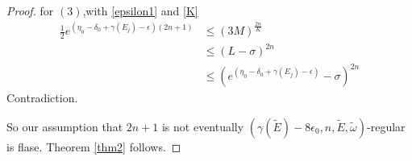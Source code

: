 \begin{proof}
for $(3)$,with \eqref{epsilon1} and \eqref{K}
\[
\begin{aligned}
  \frac{1}{2}e^{(\eta_0-\delta_0+\gamma(E_j)-\epsilon)(2n+1)}
  &\leq (3M)^{\frac{2n}{K}}\\
  &\leq (L-\sigma)^{2n}\\
  &\leq(e^{(\eta_0-\delta_0+\gamma(E_j)-\epsilon)}-\sigma)^{2n}
\end{aligned}
\]
Contradiction.

So our assumption that $2n+1$ is not eventually $(\gamma(\tilde{E})-8\epsilon_0,n,\tilde{E},\tilde{\omega})$-regular is flase. Theorem \ref{thm2} follows.
\end{proof}
